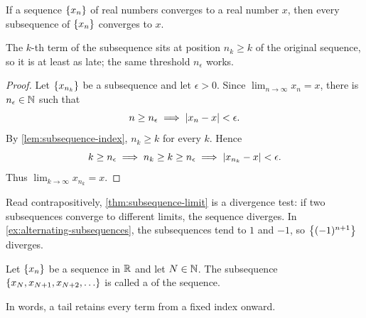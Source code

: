 \begin{theorem}\label{thm:subsequence-limit}
    If a sequence $\left\{x_n\right\}$ of real numbers converges to a real number $x$, then every subsequence of $\left\{x_n\right\}$ converges to $x$.
\end{theorem}
\begin{idea}
    The $k$-th term of the subsequence sits at position $n_k\geq k$ of the original sequence, so it is at least as late; the same threshold $n_\epsilon$ works.
\end{idea}
\begin{proof}
    Let $\left\{x_{n_k}\right\}$ be a subsequence and let $\epsilon > 0$. Since $\lim_{n\to\infty}x_n=x$, there is $n_\epsilon \in \mathbb{N}$ such that
    \begin{equation*}
        n \geq n_\epsilon \implies \left|x_n - x\right| < \epsilon.
    \end{equation*}
    By \cref{lem:subsequence-index}, $n_k\geq k$ for every $k$. Hence
    \begin{equation*}
        k \geq n_\epsilon \implies n_k \geq k \geq n_\epsilon \implies \left|x_{n_k} - x\right| < \epsilon.
    \end{equation*}
    Thus $\lim_{k\to\infty}x_{n_k}=x$.
\end{proof}
Read contrapositively, \cref{thm:subsequence-limit} is a divergence test: if two subsequences converge to different limits, the sequence diverges. In \cref{ex:alternating-subsequences}, the subsequences tend to $1$ and $-1$, so $\left\{(-1)^{n+1}\right\}$ diverges.

\begin{definition}\label{def:sequence-tail}
    Let $\left\{x_n\right\}$ be a sequence in $\mathbb{R}$ and let $N\in\mathbb{N}$.
    The subsequence $\left\{x_N,x_{N+1},x_{N+2},\ldots\right\}$ is called a
     of the sequence.
\end{definition}
In words, a tail retains every term from a fixed index onward.

